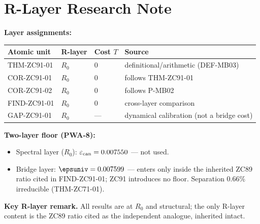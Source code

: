 \documentclass[12pt, a4paper]{article}
\renewcommand{\epscan}{\varepsilon_{\rm can}}   %
\begin{document}
\section{R-Layer Research Note}
\label{sec:rlayer-zc91}
\begin{layerbox}[title={R-Layer Assignments for ZC91}]

\textbf{Layer assignments:}

{\small\renewcommand{\arraystretch}{1.25}
\begin{center}
\begin{tabular}{@{}llll@{}}
\toprule
Atomic unit & R-layer & Cost $T$ & Source \\
\midrule
THM-ZC91-01 & $R_0$ & $0$ & definitional/arithmetic (DEF-MB03) \\
COR-ZC91-01 & $R_0$ & $0$ & follows THM-ZC91-01 \\
COR-ZC91-02 & $R_0$ & $0$ & follows P-MB02 \\
FIND-ZC91-01 & $R_0$ & $0$ & cross-layer comparison \\
GAP-ZC91-01 & $R_0$ & --- & dynamical calibration (not a bridge cost) \\
\bottomrule
\end{tabular}
\end{center}}

\textbf{Two-layer floor (PWA-8):}
\begin{itemize}[leftmargin=2em, noitemsep]
  \item Spectral layer ($R_0$): $\epscan=0.007550$ --- not used.
  \item Bridge layer: $\epsuniv=0.007599$ --- enters only inside the
    inherited ZC89 ratio cited in FIND-ZC91-01; ZC91 introduces no floor.
    Separation $0.66\%$ irreducible (THM-ZC71-01).
\end{itemize}

\textbf{Key R-layer remark.} All results are at $R_0$ and structural; the
only R-layer content is the ZC89 ratio cited as the independent analogue,
inherited intact.
\end{layerbox}

\end{document}
